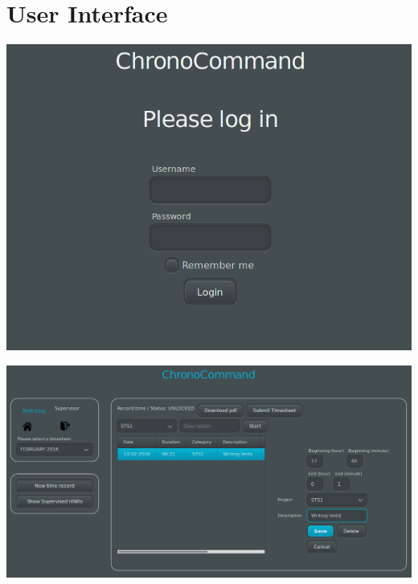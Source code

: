 





\section{User Interface}
\begin{frame}
	\begin{center}
		\includegraphics[width=\linewidth,height=0.9\textheight,keepaspectratio]{images/login.png}
	\end{center}
\end{frame}

\begin{frame}
	\begin{center}
		\includegraphics[width=\linewidth,height=0.9\textheight,keepaspectratio]{images/timerecord-edit.png}
	\end{center}
\end{frame}

